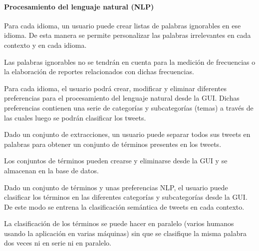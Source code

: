 \begin{functional}
\paragraph{Procesamiento del lenguaje natural (NLP)}
\item Para cada idioma, un usuario puede crear listas de palabras ignorables en ese idioma. De esta manera se permite personalizar las palabras irrelevantes en cada contexto y en cada idioma.
\item Las palabras ignorables no se tendrán en cuenta para la medición de frecuencias o la elaboración de reportes relacionados con dichas frecuencias.
\item Para cada idioma, el usuario podrá crear, modificar y eliminar diferentes preferencias para el procesamiento del lenguaje natural desde la GUI. Dichas preferencias contienen una serie de categorías y subcategorías (temas) a través de las cuales luego se podrán clasificar los tweets.
\item Dado un conjunto de extracciones, un usuario puede separar todos sus tweets en palabras para obtener un conjunto de términos presentes en los tweets.
\item Los conjuntos de términos pueden crearse y eliminarse desde la GUI y se almacenan en la base de datos.
\item Dado un conjunto de términos y unas preferencias NLP, el usuario puede clasificar los términos en las diferentes categorías y subcategorías desde la GUI. De este modo se entrena la clasificación semántica de tweets en cada contexto.
\item La clasificación de los términos se puede hacer en paralelo (varios humanos usando la aplicación en varias máquinas) sin que se clasifique la misma palabra dos veces ni en serie ni en paralelo.


\end{functional}
